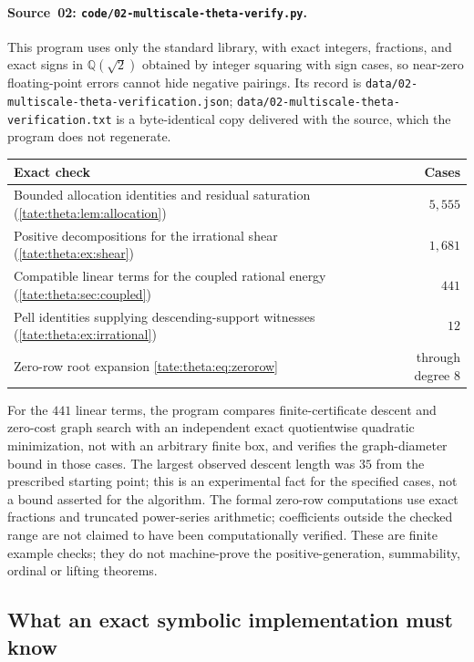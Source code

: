 \documentclass[11pt,letterpaper]{article}
\theoremstyle{definition}
\newcommand{\Q}{\mathbb Q}
\newcommand{\file}[1]{\nolinkurl{#1}}
\begin{document}
\paragraph{Source~02: \texttt{code/02-multiscale-theta-verify.py}.}
This program uses only the standard library, with exact integers,
fractions, and exact signs in $\Q(\sqrt2)$ obtained by integer squaring
with sign cases, so near-zero floating-point errors cannot hide negative
pairings. Its record is \file{data/02-multiscale-theta-verification.json};
\file{data/02-multiscale-theta-verification.txt} is a byte-identical copy
delivered with the source, which the program does not regenerate.
\begin{center}
\begin{tabular}{@{}p{}r@{}}
\toprule
Exact check & Cases\\
\midrule
Bounded allocation identities and residual saturation
 (\cref{tate:theta:lem:allocation}) & $5{,}555$\\
Positive decompositions for the irrational shear
 (\cref{tate:theta:ex:shear}) & $1{,}681$\\
Compatible linear terms for the coupled rational energy
 (\cref{tate:theta:sec:coupled}) & $441$\\
Pell identities supplying descending-support witnesses
 (\cref{tate:theta:ex:irrational}) & $12$\\
Zero-row root expansion \eqref{tate:theta:eq:zerorow} & through degree $8$\\
\bottomrule
\end{tabular}
\end{center}
For the $441$ linear terms, the program compares finite-certificate descent
and zero-cost graph search with an independent exact quotientwise quadratic
minimization, not with an arbitrary finite box, and verifies the
graph-diameter bound in those cases. The largest observed descent length
was $35$ from the prescribed starting point; this is an experimental fact
for the specified cases, not a bound asserted for the algorithm. The formal
zero-row computations use exact fractions and truncated power-series
arithmetic; coefficients outside the checked range are not claimed to have
been computationally verified. These are finite example checks; they do not
machine-prove the positive-generation, summability, ordinal or lifting
theorems.

\subsection{What an exact symbolic implementation must know}
\end{document}
